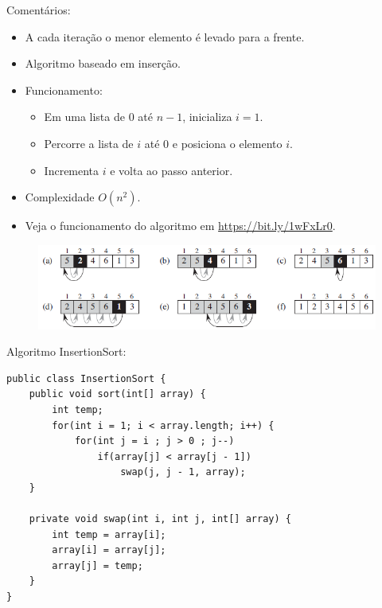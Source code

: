 \medskip

{\color{redtext}
	Comentários:
	\begin{itemize}
		\item A cada iteração o menor elemento é levado para a frente.
	\end{itemize}
}

\clearpage


\begin{itemize}
	\item Algoritmo baseado em inserção.
	\item Funcionamento:
	\begin{itemize}
		\item Em uma lista de $0$ até $n - 1$, inicializa $i = 1$.
		\item Percorre a lista de $i$ até $0$ e posiciona o elemento $i$.
		\item Incrementa $i$ e volta ao passo anterior.
	\end{itemize}
	\item Complexidade $O(n^2)$.
	\item Veja o funcionamento do algoritmo em \url{https://bit.ly/1wFxLr0}.
\end{itemize}

\medskip

\begin{figure}[H]
	\centering
	\includegraphics[width=0.85\linewidth]{img/insertion-sort}
\end{figure}

\medskip

Algoritmo InsertionSort:
\begin{verbatim}
public class InsertionSort {
	public void sort(int[] array) {
		int temp;
		for(int i = 1; i < array.length; i++) {
			for(int j = i ; j > 0 ; j--)
				if(array[j] < array[j - 1])
					swap(j, j - 1, array);
	}
	
	private void swap(int i, int j, int[] array) {
		int temp = array[i];
		array[i] = array[j];
		array[j] = temp;
	}
}
\end{verbatim}

\medskip

